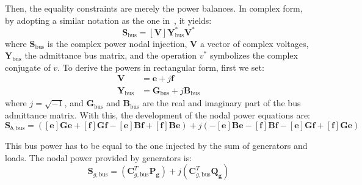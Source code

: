 \documentclass{article}
\begin{document}
Then, the equality constraints are merely the power balances. In complex form, by adopting a similar notation as the one in~\cite{zimmerman2016matpower}, it yields: 
\begin{equation}
    \bm{S}_\text{bus} = [\bm{V}]\bm{Y}^*_\text{bus}\bm{V}^*
    \label{eq:sbus}
\end{equation}
where $\bm{S}_\text{bus}$ is the complex power nodal injection, $\bm{V}$ a vector of complex voltages, $\bm{Y}_\text{bus}$ the admittance bus matrix, and the operation $v^*$ symbolizes the complex conjugate of $v$. To derive the powers in rectangular form, first we set:
\begin{align}
    \bm{V} &= \bm{e} + j\bm{f} \\
    \bm{Y}_\text{bus} &= \bm{G}_\text{bus} + j\bm{B}_\text{bus}
\end{align}
where $j=\sqrt{-1}$, and $\bm{G}_\text{bus}$ and $\bm{B}_\text{bus}$ are the real and imaginary part of the bus admittance matrix. With this, the development of the nodal power equations are:
\begin{equation}
    \bm{S}_{b,\text{bus}} = ([\bm{e}]\bm{G}\bm{e} + [\bm{f}]\bm{G}\bm{f} - [\bm{e}]\bm{B}\bm{f} + [\bm{f}]\bm{B}\bm{e}) + j(-[\bm{e}]\bm{B}\bm{e} - [\bm{f}]\bm{B}\bm{f} - [\bm{e}]\bm{G}\bm{f} + [\bm{f}]\bm{G}\bm{e})
\end{equation}

This bus power has to be equal to the one injected by the sum of generators and loads. The nodal power provided by generators is:
\begin{equation}
    \bm{S}_{g,\text{bus}} = (\bm{C}_{g,\text{bus}}^T \bm{P_g}) + j(\bm{C}_{g,\text{bus}}^T \bm{Q_g})
\end{equation}
\end{document}
